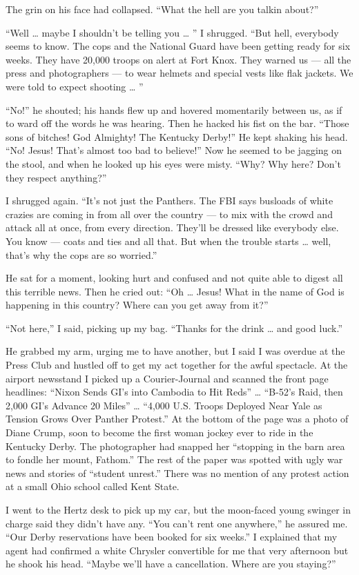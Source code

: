 \documentclass[9pt,a4paper]{extarticle}
\begin{document}
The grin on his face had collapsed. “What the hell are you talkin about?”

“Well … maybe I shouldn’t be telling you … ” I shrugged. “But hell, everybody seems to know. The cops and the National Guard have been getting ready for six weeks. They have 20,000 troops on alert at Fort Knox. They warned us — all the press and photographers — to wear helmets and special vests like flak jackets. We were told to expect shooting … ”

“No!” he shouted; his hands flew up and hovered momentarily between us, as if to ward off the words he was hearing. Then he hacked his fist on the bar. “Those sons of bitches! God Almighty! The Kentucky Derby!” He kept shaking his head. “No! Jesus! That’s almost too bad to believe!” Now he seemed to be jagging on the stool, and when he looked up his eyes were misty. “Why? Why here? Don’t they respect anything?”

I shrugged again. “It’s not just the Panthers. The FBI says busloads of white crazies are coming in from all over the country — to mix with the crowd and attack all at once, from every direction. They’ll be dressed like everybody else. You know — coats and ties and all that. But when the trouble starts … well, that’s why the cops are so worried.”

He sat for a moment, looking hurt and confused and not quite able to digest all this terrible news. Then he cried out: “Oh … Jesus! What in the name of God is happening in this country? Where can you get away from it?”

“Not here,” I said, picking up my bag. “Thanks for the drink … and good luck.”

He grabbed my arm, urging me to have another, but I said I was overdue at the Press Club and hustled off to get my act together for the awful spectacle. At the airport newsstand I picked up a Courier-Journal and scanned the front page headlines: “Nixon Sends GI’s into Cambodia to Hit Reds” … “B-52’s Raid, then 2,000 GI’s Advance 20 Miles” … “4,000 U.S. Troops Deployed Near Yale as Tension Grows Over Panther Protest.” At the bottom of the page was a photo of Diane Crump, soon to become the first woman jockey ever to ride in the Kentucky Derby. The photographer had snapped her “stopping in the barn area to fondle her mount, Fathom.” The rest of the paper was spotted with ugly war news and stories of “student unrest.” There was no mention of any protest action at a small Ohio school called Kent State.

I went to the Hertz desk to pick up my car, but the moon-faced young swinger in charge said they didn’t have any. “You can’t rent one anywhere,” he assured me. “Our Derby reservations have been booked for six weeks.” I explained that my agent had confirmed a white Chrysler convertible for me that very afternoon but he shook his head. “Maybe we’ll have a cancellation. Where are you staying?”
\end{document}
